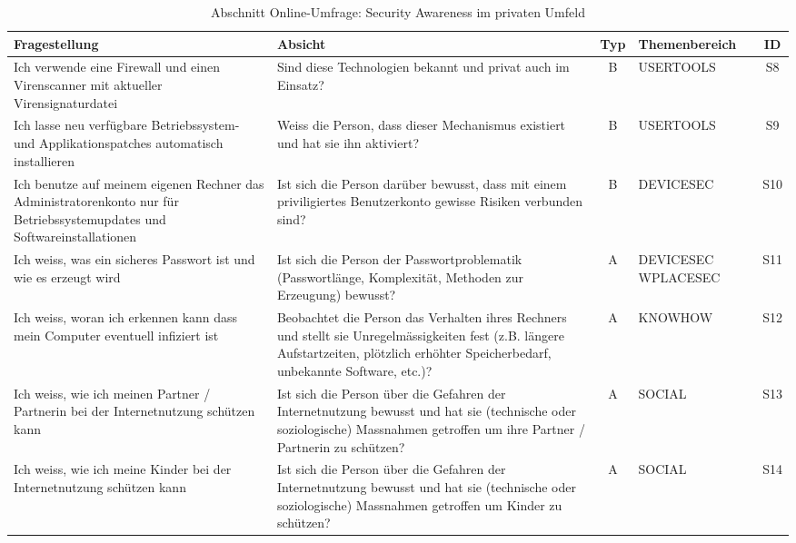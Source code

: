 \documentclass[../../main.tex]{subfiles}
\begin{document}
\begin{table}[H]
\tablefontsize	
\centering
\caption{Abschnitt Online-Umfrage: Security Awareness im privaten Umfeld}
\label{Security Awareness im privaten Umfeld}
\begin{tabular}{ |p{5.5cm}|p{5.5cm}|c|p{2.5cm}|c|}

\hline
\tableheaderbgcolor
\textbf{Fragestellung} & \textbf{Absicht} & \textbf{Typ} & \textbf{Themenbereich} & \textbf{ID}\\ 
\hline
Ich verwende eine Firewall und einen Virenscanner mit aktueller Virensignaturdatei &  Sind diese Technologien bekannt und privat auch im Einsatz? & B & USERTOOLS & S8 \\
\hline

Ich lasse neu verfügbare Betriebssystem- und Applikationspatches automatisch installieren &  Weiss die Person, dass dieser Mechanismus existiert und hat sie ihn aktiviert? & B & USERTOOLS & S9 \\
\hline

Ich benutze auf meinem eigenen Rechner das Administratorenkonto nur für Betriebssystemupdates und Softwareinstallationen &  Ist sich die Person darüber bewusst, dass mit einem priviligiertes Benutzerkonto gewisse Risiken verbunden sind? & B & DEVICESEC & S10 \\
\hline

Ich weiss, was ein sicheres Passwort ist und wie es erzeugt wird &  Ist sich die Person der Passwortproblematik (Passwortlänge, Komplexität, Methoden zur Erzeugung) bewusst? & A & DEVICESEC \newline WPLACESEC & S11 \\
\hline

Ich weiss, woran ich erkennen kann dass mein Computer eventuell infiziert ist &  Beobachtet die Person das Verhalten ihres Rechners und stellt sie Unregelmässigkeiten fest (z.B. längere Aufstartzeiten, plötzlich erhöhter Speicherbedarf, unbekannte Software, etc.)? & A & KNOWHOW & S12 \\
\hline

Ich weiss, wie ich meinen Partner / Partnerin bei der Internetnutzung schützen kann &  Ist sich die Person über die Gefahren der Internetnutzung bewusst und hat sie (technische oder soziologische) Massnahmen getroffen um ihre Partner / Partnerin zu schützen? & A & SOCIAL & S13 \\
\hline

Ich weiss, wie ich meine Kinder bei der Internetnutzung schützen kann &  Ist sich die Person über die Gefahren der Internetnutzung bewusst und hat sie (technische oder soziologische) Massnahmen getroffen um Kinder zu schützen? & A & SOCIAL & S14 \\
\hline


\end{tabular}
\end{table}
\end{document}

